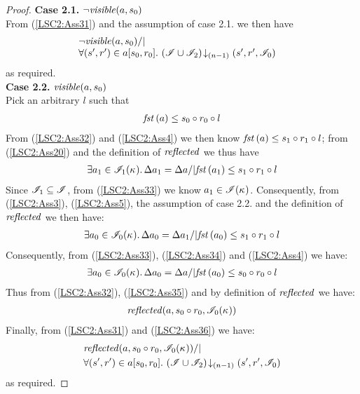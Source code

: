 \begin{lemma}
\begin{proof}
\noindent \textbf{Case 2.1. } $ \neg\mathit{visible}(a, s_0)$\\
From (\ref{LSC2:Ass31}) and the assumption of case 2.1. we then have
\begin{align*}
	&\begin{array}{@{} l @{}}
		\neg\m{visible}(a, s_0) /| \\
		\for{(s', r') \in a[s_0, r_0]} \extendsAMUpto{\lmod \cup \lmod_2}{(n-1)}{s'}{r'}{\lmod_0}
	\end{array}
\end{align*}
%
as required.\\

\noindent\textbf{Case 2.2. } $\mathit{visible}(a, s_0)$\\
Pick an arbitrary $l$ such that 
%
\begin{align}
	\mathit{fst}\left(a\right) \leq s_0 \circ r_0 \circ l
	\label{LSC2:Ass32}
\end{align}
From (\ref{LSC2:Ass32}) and (\ref{LSC2:Ass4}) we then know $\mathit{fst}\left(a\right) \leq s_1 \circ r_1 \circ l$; from (\ref{LSC2:Ass20}) and the definition of $\mathit{reflected}$ we thus have
%
\begin{align}
	\exists a_1 \in \mathscr{I}_1(\kappa_{}) .\, \Delta {a_1} = \Delta {a} /| \mathit{fst}\left(a_1\right) \leq s_1 \circ r_1 \circ l
	\label{LSC2:Ass33}
\end{align}
%
Since $\mathscr{I}_1 \subseteq \mathscr{I}$, from (\ref{LSC2:Ass33}) we know $a_1 \in \mathscr{I}(\kappa_{})$. Consequently, from (\ref{LSC2:Ass3}), (\ref{LSC2:Ass5}), the assumption of case 2.2. and the definition of $\mathit{reflected}$ we then have:
\begin{align}
	\exists a_0 \in \mathscr{I}_0(\kappa_{}) .\, \Delta {a_0} = \Delta {a_1} /| \mathit{fst}\left(a_0\right) \leq s_1 \circ r_1 \circ l
	\label{LSC2:Ass34}
\end{align}
%
Consequently, from (\ref{LSC2:Ass33}), (\ref{LSC2:Ass34}) and (\ref{LSC2:Ass4}) we have:
\begin{align}
	\exists a_0 \in \mathscr{I}_0(\kappa_{}) .\, \Delta {a_0} = \Delta {a} /| \mathit{fst}\left(a_0\right) \leq s_0 \circ r_0 \circ l
	\label{LSC2:Ass35}
\end{align}
%
Thus from (\ref{LSC2:Ass32}), (\ref{LSC2:Ass35}) and by definition of $\mathit{reflected}$ we have:
%
\begin{align}
	\mathit{reflected}(a, s_0 \circ r_0, \mathscr{I}_0(\kappa_{})) 
	\label{LSC2:Ass36}
\end{align}
%
Finally, from (\ref{LSC2:Ass31}) and (\ref{LSC2:Ass36}) we have:
%
\begin{align*}
	& \mathit{reflected}(a, s_0 \circ r_0, \mathscr{I}_0(\kappa_{}))  /| \\
	& \forall (s', r') \in a[s_0, r_0].\, \left(\mathscr{I} \cup \mathscr{I}_2\right) \!\downarrow_{(n-1)} \left(s', r', \mathscr{I}_0\right)
\end{align*}
%
as required.

\end{proof}
%
\end{lemma}
